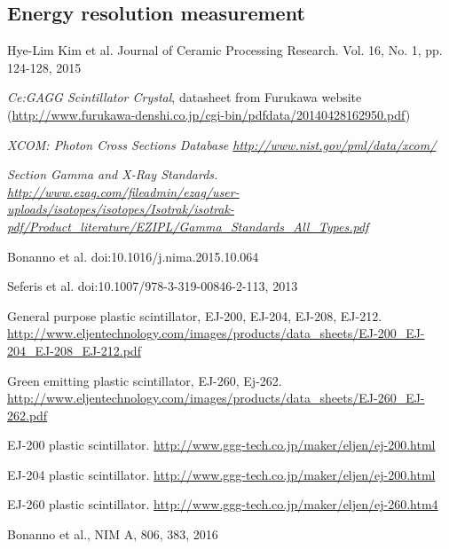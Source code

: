 \documentclass[10pt,a4paper, openany]{book}
\begin{document}
\subsection{Energy resolution measurement}


\clearpage
{}
\begin{thebibliography}{20}

Hye-Lim Kim et al. Journal of Ceramic Processing Research. Vol. 16, No. 1, pp. 124-128, 2015

\emph{Ce:GAGG Scintillator Crystal}, datasheet from Furukawa website (\url{http://www.furukawa-denshi.co.jp/cgi-bin/pdfdata/20140428162950.pdf})

\emph{XCOM: Photon Cross Sections Database \url{http://www.nist.gov/pml/data/xcom/}}

\emph{Section Gamma and X-Ray Standards. \url{http://www.ezag.com/fileadmin/ezag/user-uploads/isotopes/isotopes/Isotrak/isotrak-pdf/Product_literature/EZIPL/Gamma_Standards_All_Types.pdf}}

Bonanno et al. doi:10.1016/j.nima.2015.10.064

Seferis et al. doi:10.1007/978-3-319-00846-2-113, 2013

General purpose plastic scintillator, EJ-200, EJ-204, EJ-208, EJ-212. \url{http://www.eljentechnology.com/images/products/data_sheets/EJ-200_EJ-204_EJ-208_EJ-212.pdf}

Green emitting plastic scintillator, EJ-260, Ej-262. \url{http://www.eljentechnology.com/images/products/data_sheets/EJ-260_EJ-262.pdf}

EJ-200 plastic scintillator. \url{http://www.ggg-tech.co.jp/maker/eljen/ej-200.html}

EJ-204 plastic scintillator. \url{http://www.ggg-tech.co.jp/maker/eljen/ej-200.html}

EJ-260 plastic scintillator. \url{http://www.ggg-tech.co.jp/maker/eljen/ej-260.htm4}

Bonanno et al., NIM A, 806, 383, 2016

\end{thebibliography}
\end{document}

